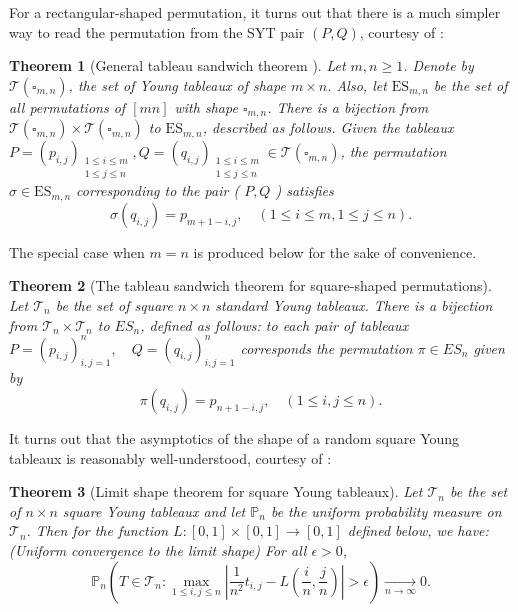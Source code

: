 \documentclass[11pt, a4paper]{article}
\theoremstyle{compact}
\newtheorem{theorem}{Theorem}[section]
\begin{document}
 For a rectangular-shaped permutation, it turns out that there is a much simpler way to read the permutation from the SYT pair $(P,Q)$, courtesy of \cite{Sur_math} :
 \begin{theorem}[General tableau sandwich theorem \cite{Sur_math}]\label{Gen_tab}
    Let $m, n \geq 1$. Denote by $\mathcal{T}\left(\square_{m, n}\right)$, the set of Young tableaux of shape $m \times n$. Also, let $\mathrm{ES}_{m,n}$ be the set of all permutations of $[mn]$ with shape $\square_{m, n}$. There is a bijection from $\mathcal{T}\left(\square_{m, n}\right) \times \mathcal{T}\left(\square_{m, n}\right)$ to $\mathrm{ES}_{m, n}$, described as follows. Given the tableaux $P=\left(p_{i, j}\right)_{\substack{1 \leq i \leq m \\ 1 \leq j \leq n}}, Q=\left(q_{i, j}\right)_{\substack{1 \leq i \leq m \\ 1 \leq j \leq n}} \in \mathcal{T}\left(\square_{m, n}\right)$, the permutation $\sigma \in \mathrm{ES}_{m, n}$ corresponding to the pair ( $P, Q$ ) satisfies
\begin{equation*}
\sigma\left(q_{i, j}\right)=p_{m+1-i, j}, \quad(1 \leq i \leq m, 1 \leq j \leq n) . 
\end{equation*}
\end{theorem}

The special case when $m=n$ is produced below for the sake of convenience.
\begin{theorem}[The tableau sandwich theorem for square-shaped permutations]\label{sandwich}
    \hspace{5mm} Let $\mathcal{T}_n$ be the set of square $n \times n$ standard Young tableaux. There is a bijection from $\mathcal{T}_n \times \mathcal{T}_n$ to $ E S_n$, defined as follows: to each pair of tableaux $P=\left(p_{i, j}\right)_{i, j=1}^n, \quad Q=\left(q_{i, j}\right)_{i, j=1}^n$ corresponds the permutation $\pi \in  E S_n$ given by
\begin{equation*}
\pi\left(q_{i, j}\right)=p_{n+1-i, j}, \quad(1 \leq i, j \leq n) .
\end{equation*}
\end{theorem}

It turns out that the asymptotics of the shape of a random square Young tableaux is reasonably well-understood, courtesy of \cite{lim_shapes}:
\begin{theorem}[Limit shape theorem for square Young tableaux]\label{limit_shape}
     Let $\mathcal{T}_n$ be the set of $n \times n$ square Young tableaux and let $\mathbb{P}_n$ be the uniform probability measure on $\mathcal{T}_n$. Then for the function $L:[0,1] \times[0,1] \rightarrow[0,1]$ defined below, we have: \\
     (Uniform convergence to the limit shape) For all $\epsilon>0$,
$$
\mathbb{P}_n\left(T \in \mathcal{T}_n: \max _{1 \leqslant i, j \leqslant n}\left|\frac{1}{n^2} t_{i, j}-L\left(\frac{i}{n}, \frac{j}{n}\right)\right|>\epsilon\right) \underset{n \rightarrow \infty}{\longrightarrow} 0 .
$$
\end{theorem}
\end{document}
